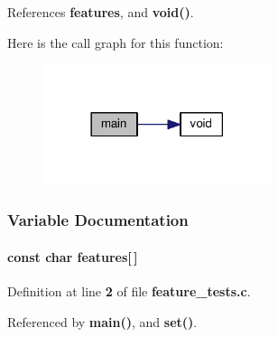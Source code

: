 References {\bf features}, and {\bf void()}.



Here is the call graph for this function\+:
\nopagebreak
\begin{figure}[H]
\begin{center}
\leavevmode
\includegraphics[width=189pt]{d2/d03/soapysdr_2build_2CMakeFiles_2feature__tests_8c_a3c04138a5bfe5d72780bb7e82a18e627_cgraph}
\end{center}
\end{figure}




\subsubsection{Variable Documentation}
\paragraph[{features}]{\setlength{\rightskip}{0pt plus 5cm}const char features[$\,$]}\label{soapysdr_2build_2CMakeFiles_2feature__tests_8c_a1582568e32f689337602a16bf8a5bff0}


Definition at line {\bf 2} of file {\bf feature\+\_\+tests.\+c}.



Referenced by {\bf main()}, and {\bf set()}.

